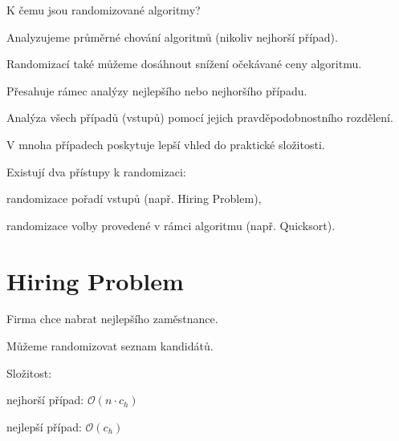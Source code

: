 \begin{compactitem}
    \item K čemu jsou randomizované algoritmy? \begin{compactitem}
        \item Analyzujeme průměrné chování algoritmů (nikoliv nejhorší případ).

        \item Randomizací také můžeme dosáhnout snížení očekávané ceny algoritmu.
    \end{compactitem}

    \item Přesahuje rámec analýzy nejlepšího nebo nejhoršího případu. \begin{compactitem}
        \item Analýza všech případů (vstupů) pomocí jejich pravděpodobnostního rozdělení.

        \item V mnoha případech poskytuje lepší vhled do praktické složitosti.

    \end{compactitem}

    \item Existují dva přístupy k randomizaci: \begin{compactitem}
        \item randomizace pořadí vstupů (např. Hiring Problem),

        \item randomizace volby provedené v rámci algoritmu (např. Quicksort).
    \end{compactitem}
\end{compactitem}


\section{Hiring Problem}

\begin{compactitem}
    \item Firma chce nabrat nejlepšího zaměstnance.

    \item Můžeme randomizovat seznam kandidátů.

    \item Složitost: \begin{compactitem}
        \item nejhorší případ: $\mathcal{O}(n \cdot c_h)$
        \item nejlepší případ: $\mathcal{O}(c_h)$
    \end{compactitem}
\end{compactitem}

